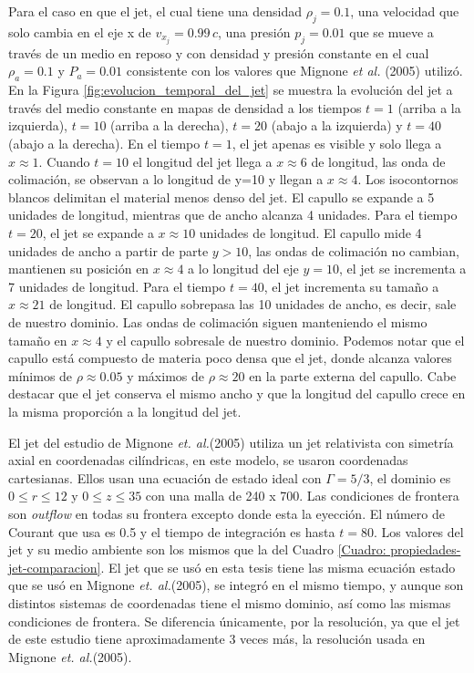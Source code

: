 \documentclass[12pt,a4paper]{book}
\begin{document}
Para el caso en que el jet, el cual tiene una densidad $\rho_j = 0.1$, una velocidad que
solo cambia en el eje x de $v_{x_{j}} = 0.99 \, c$, una presión $p_j = 0.01$ que se mueve a través de un medio en reposo y con densidad y presión constante en el cual 
$\rho_a = 0.1 $ y $P_a = 0.01$  consistente con los valores que Mignone \emph{et al.} (2005) utilizó. 
En la Figura \ref{fig:evolucion_temporal_del_jet} se muestra la evolución del jet a 
través del medio constante en mapas de densidad
a los tiempos $t = 1$ (arriba a la izquierda), $t = 10$ (arriba a la derecha), 
$t = 20$ (abajo a la izquierda) y $t = 40$ (abajo a la derecha).
En el tiempo $t = 1$, el jet apenas es visible y solo llega a $x \approx 1$. 
Cuando $t = 10$ el longitud del jet llega  a $x \approx 6$ de longitud, las onda de colimación, se observan a 
lo longitud de y=10 y llegan a $x \approx 4$. Los  isocontornos blancos delimitan el material menos denso del jet. 
El capullo se expande a 5 unidades de longitud, mientras que de ancho alcanza 4 unidades.
Para el tiempo $t = 20$, el jet se expande a 
$x \approx 10$ unidades de longitud. El capullo mide 4 unidades de ancho a partir de parte $y > 10$, 
las ondas de colimación no cambian, mantienen su posición en $x \approx 4$ a lo longitud del eje $y = 10$, el jet se incrementa
a 7 unidades de longitud. Para el tiempo $t = 40$, el jet incrementa su tamaño a $x \approx 21$ de longitud. 
El capullo sobrepasa las 10 unidades de ancho, es decir, sale de nuestro dominio. Las ondas de colimación siguen manteniendo el mismo 
tamaño en $x \approx 4$ y el capullo sobresale de nuestro dominio. Podemos notar que el capullo está compuesto 
de materia poco densa que el jet, donde alcanza valores mínimos de $\rho \approx 0.05 $ y 
máximos de $\rho  \approx 20$ en la
parte externa del capullo. Cabe destacar que el jet conserva el mismo ancho y que la longitud del capullo crece 
en la misma proporción a la longitud del jet.

El jet del estudio de  Mignone \emph{et. al.}(2005) utiliza un jet relativista con simetría axial en 
coordenadas cilíndricas,  en este modelo, se usaron coordenadas cartesianas. 
Ellos usan una ecuación de estado ideal con $\Gamma = 5/3$, el dominio es 
$0 \leqslant r \leqslant 12$ y $0 \leqslant z \leqslant 35$ con una malla de 240 x 700. Las condiciones de
frontera son \emph{outflow} en todas su frontera excepto donde esta la eyección. El número de Courant que
usa es 0.5 y el tiempo de integración es hasta $t = 80$. Los valores del jet y su medio ambiente son los
mismos que la del Cuadro \ref{Cuadro: propiedades-jet-comparacion}. El jet que se usó en esta tesis tiene las 
misma ecuación estado que se usó en Mignone \emph{et. al.}(2005), se integró en el mismo tiempo, y aunque son distintos 
sistemas de coordenadas tiene el mismo dominio, así como las mismas condiciones de frontera. Se diferencia únicamente,
por la resolución, ya que el jet de este estudio tiene aproximadamente 3 veces más, la resolución usada en Mignone 
\emph{et. al.}(2005).
\end{document}
